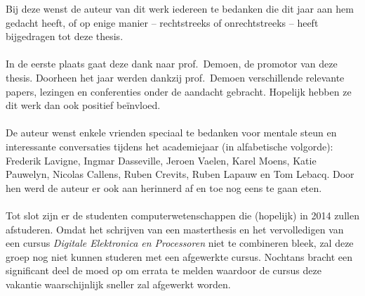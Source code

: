 \documentclass[master=cws,masteroption=ai]{kulemt}
\begin{document}
\begin{preface}
  Bij deze wenst de auteur van dit werk iedereen te bedanken die dit jaar aan hem gedacht heeft, of op enige manier -- rechtstreeks of onrechtstreeks -- heeft bijgedragen tot deze thesis.
  \paragraph{}
  In de eerste plaats gaat deze dank naar prof.~Demoen, de promotor van deze thesis. Doorheen het jaar werden dankzij prof.~Demoen verschillende relevante papers, lezingen en conferenties onder de aandacht gebracht. Hopelijk hebben ze dit werk dan ook positief be\"invloed.
  \paragraph{}
  De auteur wenst enkele vrienden speciaal te bedanken voor mentale steun en interessante conversaties tijdens het academiejaar (in alfabetische volgorde): \nohyphens{Frederik Lavigne, Ingmar Dasseville, Jeroen Vaelen, Karel Moens, Katie Pauwelyn, Nicolas Callens, Ruben Crevits, Ruben Lapauw en Tom Lebacq}. Door hen werd de auteur er ook aan herinnerd af en toe nog eens te gaan eten.
  \paragraph{}
  Tot slot zijn er de studenten computerwetenschappen die (hopelijk) in 2014 zullen afstuderen. Omdat het schrijven van een masterthesis en het vervolledigen van een cursus \emph{Digitale Elektronica en Processoren} niet te combineren bleek, zal deze groep nog niet kunnen studeren met een afgewerkte cursus. Nochtans bracht een significant deel de moed op om errata te melden waardoor de cursus deze vakantie waarschijnlijk sneller zal afgewerkt worden.
\end{preface}



\mainmatter
{}



\appendixpage*          %
\appendix


\backmatter
\begin{multicols}{2}


\end{multicols}
\end{document}
